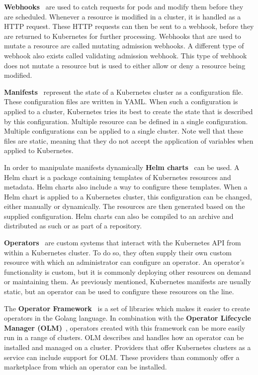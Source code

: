 \textbf{Webhooks}~\cite{kubernetes-webhooks} are used to catch requests for pods and modify them before they are scheduled.
Whenever a resource is modified in a cluster, it is handled as a HTTP request.
These HTTP requests can then be sent to a webhook, before they are returned to Kubernetes for further processing.
Webhooks that are used to mutate a resource are called mutating admission webhooks.
A different type of webhook also exists called validating admission webhook.
This type of webhook does not mutate a resource but is used to either allow or deny a resource being modified.

\textbf{Manifests}~\cite{kubernetes-manifests} represent the state of a Kubernetes cluster as a configuration file.
These configuration files are written in YAML.
When such a configuration is applied to a cluster, Kubernetes tries its best to create the state that is described by this configuration.
Multiple resource can be defined in a single configuration.
Multiple configurations can be applied to a single cluster.
Note well that these files are static, meaning that they do not accept the application of variables when applied to Kubernetes.

In order to manipulate manifests dynamically \textbf{Helm charts}~\cite{helm-charts} can be used.
A Helm chart is a package containing templates of Kubernetes resources and metadata.
Helm charts also include a way to configure these templates.
When a Helm chart is applied to a Kubernetes cluster, this configuration can be changed, either manually or dynamically.
The resources are then generated based on the supplied configuration.
Helm charts can also be compiled to an archive and distributed as such or as part of a repository.

\textbf{Operators}~\cite{kubernetes-operator} are custom systems that interact with the Kubernetes API from within a Kubernetes cluster.
To do so, they often supply their own custom resource with which an administrator can configure an operator.
An operator's functionality is custom, but it is commonly deploying other resources on demand or maintaining them.
As previously mentioned, Kubernetes manifests are usually static, but an operator can be used to configure these resources on the line.

The \textbf{Operator Framework}~\cite{operator-framework, operator-lifecycle-manager} is a set of libraries which makes it easier to create operators in the Golang language.
In combination with the \textbf{Operator Lifecycle Manager (OLM)}~\cite{operator-lifecycle-manager}, operators created with this framework can be more easily run in a range of clusters.
OLM describes and handles how an operator can be installed and managed on a cluster.
Providers that offer Kubernetes clusters as a service can include support for OLM.
These providers than commonly offer a marketplace from which an operator can be installed.


